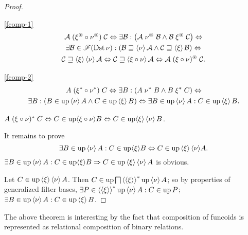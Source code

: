 \begin{proof}
~
\begin{widedisorder}
\item [{\ref{fcomp-1}}]
\begin{multline*}
\mathcal{A}\mathrel{(\xi^{\circledast}\circ\nu^{\circledast})}\mathcal{C}
\Leftrightarrow\exists\mathcal{B}:\left(\mathcal{A}\mathrel{\nu^{\circledast}}
\mathcal{B}\wedge\mathcal{B}\mathrel{\xi^{\circledast}}\mathcal{C}
\right)\Leftrightarrow\\
\exists\mathcal{B}\in\mathscr{F}(\operatorname{Dst}\nu):(\mathcal{B}\sqsupseteq\left\langle \nu\right\rangle
\mathcal{A}\wedge\mathcal{C}\sqsupseteq\left\langle \xi\right\rangle\mathcal{B})\Leftrightarrow\\
\mathcal{C}\sqsupseteq\left\langle \xi\right\rangle\left\langle \nu\right\rangle\mathcal{A}\Leftrightarrow\mathcal
{C}\sqsupseteq\left\langle \xi\circ\nu\right\rangle\mathcal{A}\Leftrightarrow\mathcal{A}\mathrel{
(\xi\circ\nu)^{\circledast}}\mathcal{C}.
\end{multline*}

\item [{\ref{fcomp-2}}] ~
\begin{multline*}
A\mathrel{(\xi^{\ast}\circ\nu^{\ast})}C\Leftrightarrow\exists
B:\left(A\mathrel{\nu^{\ast}}B\wedge
B\mathrel{\xi^{\ast}}C\right)\Leftrightarrow\\
\exists B:(B\in\operatorname{up}\left\langle \nu\right\rangle A\wedge
C\in\operatorname{up}\left\langle \xi\right\rangle B)\Leftrightarrow\exists
B\in\operatorname{up}\left\langle \nu\right\rangle A:C\in\operatorname{up}\left\langle \xi\right\rangle B.
\end{multline*}

\end{widedisorder}
$A\mathrel{(\xi\circ\nu)^{\ast}}C\Leftrightarrow C\in\operatorname{up}\langle\xi\circ\nu\rangle
B\Leftrightarrow C\in\operatorname{up}\langle\xi\rangle\left\langle \nu\right\rangle B$.

It remains to prove
\[
\exists B\in\operatorname{up}\left\langle \nu\right\rangle A:C\in\operatorname{up}\langle\xi\rangle B\Leftrightarrow
C\in\operatorname{up}\left\langle \xi\right\rangle\langle\nu\rangle A.
\]
$\exists B\in\operatorname{up}\left\langle \nu\right\rangle A:C\in\operatorname{up}\langle\xi\rangle B\Rightarrow
C\in\operatorname{up}\left\langle \xi\right\rangle\left\langle \nu\right\rangle A$
is obvious.

Let $C\in\operatorname{up}\left\langle \xi\right\rangle\left\langle \nu\right\rangle A$. Then
$C\in\operatorname{up}\bigsqcap\left\langle \left\langle \xi\right\rangle\right\rangle ^{\ast}\operatorname{up}\left\langle \nu\right\rangle A$;
so by properties of generalized filter bases, $\exists
P\in\left\langle \left\langle \xi\right\rangle\right\rangle ^{\ast}\operatorname{up}\left\langle \nu\right\rangle A:C\in\operatorname{up} P$;
$\exists B\in\operatorname{up}\left\langle \nu\right\rangle A:C\in\operatorname{up}\left\langle \xi\right\rangle B$.
\end{proof}
\begin{rem}
The above theorem is interesting by the fact that composition of funcoids
is represented as relational composition of binary relations.
\end{rem}

